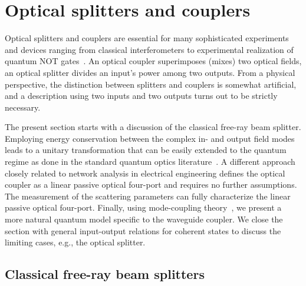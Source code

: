 \section{Optical splitters and couplers}

Optical splitters and couplers are essential for many sophisticated experiments and devices ranging from classical interferometers to experimental realization of quantum NOT gates~\cite{Adami1998}.
An optical coupler superimposes (mixes) two optical fields, an optical splitter divides an input's power among two outputs.
From a physical perspective, the distinction between splitters and couplers is somewhat artificial, and a description using two inputs and two outputs turns out to be strictly necessary.

The present section starts with a discussion of the classical free-ray beam splitter. Employing energy conservation between the complex in- and output field modes leads to a unitary transformation that can be easily extended to the quantum regime as done in the standard quantum optics literature~\cite{Leonhardt2010,Gerry2005,Loudon2000}.
A different approach closely related to network analysis in electrical engineering defines the optical coupler as a linear passive optical four-port and requires no further assumptions.
The measurement of the scattering parameters can fully characterize the linear passive optical four-port.
Finally, using mode-coupling theory~\cite[p.~359]{Luks2009}, we present a more natural quantum model specific to the waveguide coupler.
We close the section with general input-output relations for coherent states to discuss the limiting cases, e.g., the optical splitter.

\subsection{Classical free-ray beam splitters}

